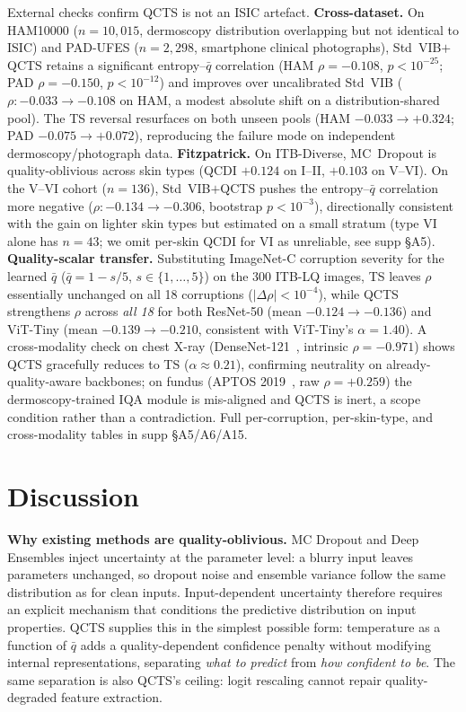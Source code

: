 \documentclass{bmvc2k}
\newcommand{\qbar}{\bar{q}}
\begin{document}
External checks confirm QCTS is not an ISIC artefact. \textbf{Cross-dataset.} On HAM10000 ($n{=}10{,}015$, dermoscopy distribution overlapping but not identical to ISIC) and PAD-UFES ($n{=}2{,}298$, smartphone clinical photographs), Std~VIB$+$QCTS retains a significant entropy--$\qbar$ correlation (HAM $\rho{=}-0.108$, $p{<}10^{-25}$; PAD $\rho{=}-0.150$, $p{<}10^{-12}$) and improves over uncalibrated Std~VIB ($\rho{:}{-}0.033\to{-}0.108$ on HAM, a modest absolute shift on a distribution-shared pool). The TS reversal resurfaces on both unseen pools (HAM $-0.033\to+0.324$; PAD $-0.075\to+0.072$), reproducing the failure mode on independent dermoscopy/photograph data. \textbf{Fitzpatrick.} On ITB-Diverse, MC~Dropout is quality-oblivious across skin types (QCDI $+0.124$ on I--II, $+0.103$ on V--VI). On the V--VI cohort ($n{=}136$), Std~VIB$+$QCTS pushes the entropy--$\qbar$ correlation more negative ($\rho{:}{-}0.134\to{-}0.306$, bootstrap $p{<}10^{-3}$), directionally consistent with the gain on lighter skin types but estimated on a small stratum (type VI alone has $n{=}43$; we omit per-skin QCDI for VI as unreliable, see supp \S A5). \textbf{Quality-scalar transfer.} Substituting ImageNet-C corruption severity for the learned $\qbar$ ($\bar q = 1 - s/5$, $s\in\{1,\ldots,5\}$) on the 300 ITB-LQ images, TS leaves $\rho$ essentially unchanged on all 18 corruptions ($|\Delta\rho|{<}10^{-4}$), while QCTS strengthens $\rho$ across \emph{all 18} for both ResNet-50 (mean $-0.124\to-0.136$) and ViT-Tiny (mean $-0.139\to-0.210$, consistent with ViT-Tiny's $\alpha{=}1.40$). A cross-modality check on chest X-ray (DenseNet-121~\cite{cohen2022torchxrayvision}, intrinsic $\rho{=}-0.971$) shows QCTS gracefully reduces to TS ($\alpha{\approx}0.21$), confirming neutrality on already-quality-aware backbones; on fundus (APTOS 2019~\cite{aptos2019}, raw $\rho{=}+0.259$) the dermoscopy-trained IQA module is mis-aligned and QCTS is inert, a scope condition rather than a contradiction. Full per-corruption, per-skin-type, and cross-modality tables in supp \S A5/A6/A15.

\section{Discussion}
\label{sec:discussion}

\textbf{Why existing methods are quality-oblivious.}
MC Dropout and Deep Ensembles inject uncertainty at the parameter level: a blurry input leaves parameters unchanged, so dropout noise and ensemble variance follow the same distribution as for clean inputs. Input-dependent uncertainty therefore requires an explicit mechanism that conditions the predictive distribution on input properties. QCTS supplies this in the simplest possible form: temperature as a function of $\qbar$ adds a quality-dependent confidence penalty without modifying internal representations, separating \emph{what to predict} from \emph{how confident to be}. The same separation is also QCTS's ceiling: logit rescaling cannot repair quality-degraded feature extraction.
\end{document}
